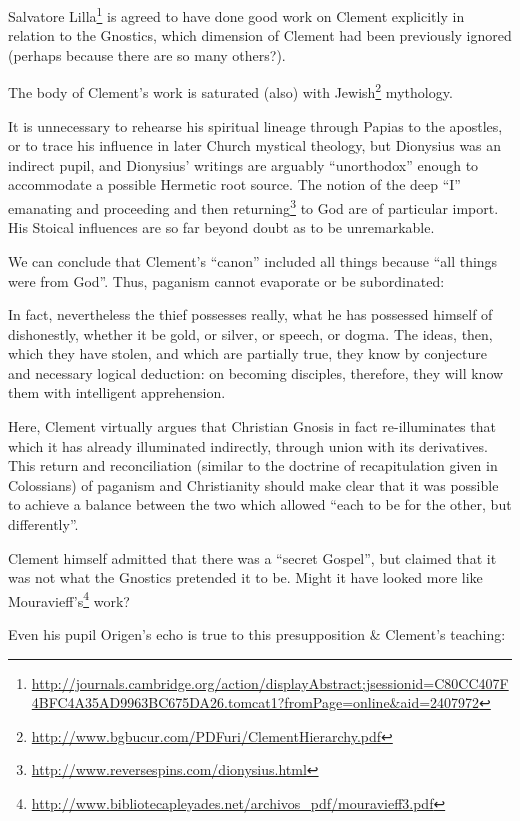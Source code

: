 Salvatore Lilla\footnote{\url{http://journals.cambridge.org/action/displayAbstract;jsessionid=C80CC407F4BFC4A35AD9963BC675DA26.tomcat1?fromPage=online\&aid=2407972}} is agreed to have done good work on Clement explicitly in relation to the Gnostics, which dimension of Clement had been previously ignored (perhaps because there are so many others?).

The body of Clement's work is saturated (also) with Jewish\footnote{\url{http://www.bgbucur.com/PDFuri/ClementHierarchy.pdf}} mythology.

It is unnecessary to rehearse his spiritual lineage through Papias to the apostles, or to trace his influence in later Church mystical theology, but Dionysius was an indirect pupil, and Dionysius' writings are arguably ``unorthodox'' enough to accommodate a possible Hermetic root source. The notion of the deep ``I'' emanating and proceeding and then returning\footnote{\url{http://www.reversespins.com/dionysius.html}} to God are of particular import. His Stoical influences are so far beyond doubt as to be unremarkable.

We can conclude that Clement's ``canon'' included all things because ``all things were from God''. Thus, paganism cannot evaporate or be subordinated:

\begin{quotex}
In fact, nevertheless the thief possesses really, what he has possessed himself of dishonestly, whether it be gold, or silver, or speech, or dogma. The ideas, then, which they have stolen, and which are partially true, they know by conjecture and necessary logical deduction: on becoming disciples, therefore, they will know them with intelligent apprehension.
\end{quotex}


Here, Clement virtually argues that Christian Gnosis in fact re-illuminates that which it has already illuminated indirectly, through union with its derivatives. This return and reconciliation (similar to the doctrine of recapitulation given in Colossians) of paganism and Christianity should make clear that it was possible to achieve a balance between the two which allowed ``each to be for the other, but differently''.

Clement himself admitted that there was a ``secret Gospel'', but claimed that it was not what the Gnostics pretended it to be. Might it have looked more like Mouravieff's\footnote{\url{http://www.bibliotecapleyades.net/archivos_pdf/mouravieff3.pdf}} work?

Even his pupil Origen's echo is true to this presupposition \& Clement's teaching:

